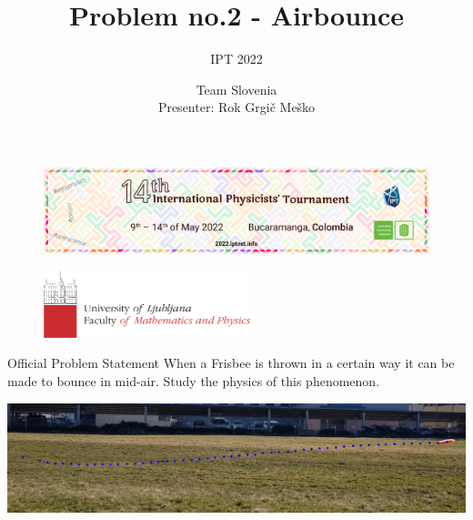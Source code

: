 \documentclass{beamer}
\title[2. Airbounce]{Problem no.2 - Airbounce}
\subtitle{IPT 2022}
\author[University of Ljubljana]{Team Slovenia \\ Presenter: Rok Grgi\v c Me\v sko}
\date{\vspace{-5ex}}
\begin{document}
\begin{frame}

\begin{figure}[H]
	\centering
	  \includegraphics[width=\textwidth]{naslovnica_ipt.png}
\end{figure}

\titlepage %

\vspace{-13mm}
\begin{figure}[H]
	\flushleft
	  \includegraphics[width=6cm]{fmf_logo.png}
\end{figure}

\end{frame}





\begin{frame}

\begin{block}{Official Problem Statement}
When a Frisbee is thrown in a certain way it can be made to bounce in mid-air. Study the physics of this phenomenon.
\end{block}
\includegraphics[width=\textwidth]{primer_meta.png}

\end{frame}

\end{document}
